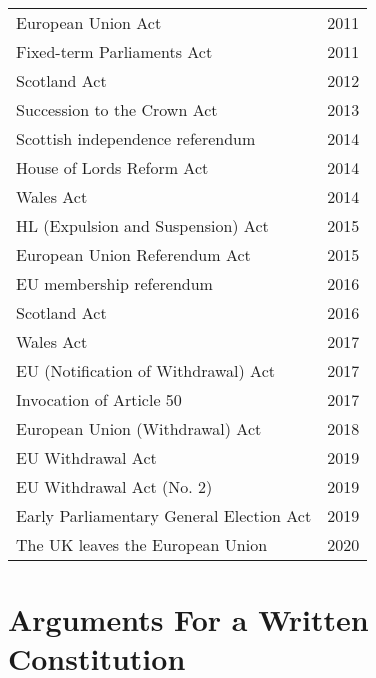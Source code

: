 \documentclass[14pt,titlepage]{extarticle}
\begin{document}
{\begin{longtable}{l l}
European Union Act &  2011\\
Fixed-term Parliaments Act & 2011\\
Scotland Act &  2012\\
Succession to the Crown Act &  2013\\
Scottish independence referendum & 2014\\
House of Lords Reform Act & 2014\\
Wales Act &  2014\\
HL (Expulsion and Suspension) Act & 2015\\
European Union Referendum Act & 2015\\
EU membership referendum & 2016\\
Scotland Act &  2016\\
Wales Act &  2017\\
EU (Notification of Withdrawal) Act & 2017\\
Invocation of Article 50 & 2017\\
European Union (Withdrawal) Act & 2018\\
EU Withdrawal Act &  2019\\
EU Withdrawal Act (No. 2) & 2019\\
Early Parliamentary General Election Act & 2019\\
The UK leaves the European Union & 2020\\
\end{longtable}
}%

\pagebreak
\section{Arguments For a Written Constitution}\label{For}
\end{document}
